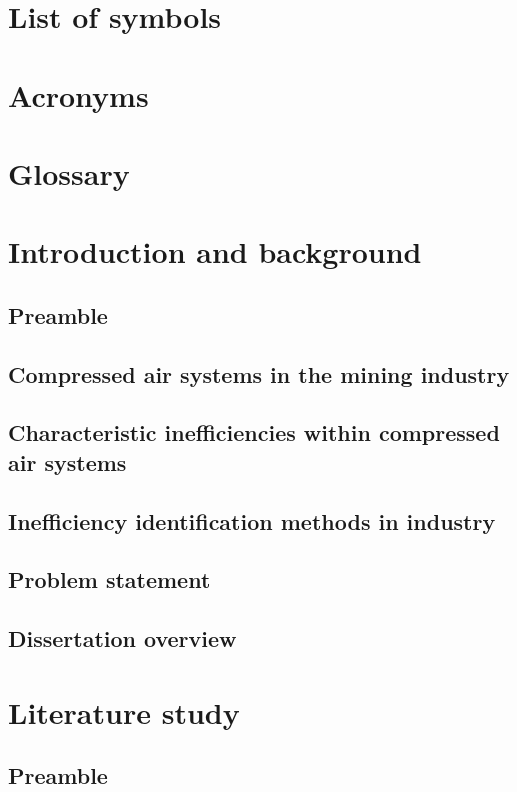 \documentclass[12pt, english, oneside, singlespacing, open=any]{report}
\begin{document}
 
 
\tableofcontents
\begin{abstract}
\end{abstract}
\chapter*{List of symbols}
\chapter*{Acronyms}
\chapter*{Glossary}

\chapter{Introduction and background}
\section{Preamble}
	\section{Compressed air systems in the mining industry}
	 \section{Characteristic inefficiencies within compressed air systems }
	 \section{Inefficiency identification methods in industry}
	 \section{Problem statement}
	 \section{Dissertation overview}
 
\chapter{Literature study}
	\section{Preamble}
\end{document}
